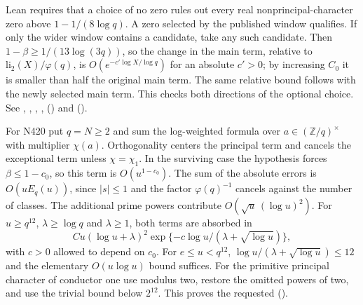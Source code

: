 Lean requires that a choice of no zero rules out every real
nonprincipal-character zero above $1-1/(8\log q)$. A zero selected
by the published window qualifies. If only the wider window contains a
candidate, take any such candidate. Then
$1-\beta\ge1/(13\log(3q))$, so the change in the main term, relative to
$\mathrm{li}_2(X)/\varphi(q)$, is
$O(e^{-c'\log X/\log q})$ for an absolute $c'>0$; by increasing $C_0$
it is smaller than half the original main term. The same relative
bound follows with the newly selected main term. This checks both
directions of the optional choice.
See , , , ,
 () and
 ().

For N420 put $q=N\ge2$ and sum the log-weighted formula over
$a\in(\mathbb Z/q)^\times$ with multiplier $\chi(a)$. Orthogonality
centers the principal term and cancels the exceptional term unless
$\chi=\chi_1$. In the surviving case the hypothesis 
forces $\beta\le 1-c_0$, so this term is $O(u^{1-c_0})$.
The sum of the absolute errors is $O(u E_q(u))$, since
$|s|\le1$ and the factor $\varphi(q)^{-1}$ cancels against the number
of classes. The additional prime powers contribute
$O(\sqrt u\,(\log u)^2)$. For $u\ge q^{12}$, $\lambda\ge\log q$
and $\lambda\ge1$, both terms are absorbed in
\[
 C u(\log u+\lambda)^2
   \exp\{-c\log u/(\lambda+\sqrt{\log u})\},
\]
with $c>0$ allowed to depend on $c_0$. For $e\le u<q^{12}$,
$\log u/(\lambda+\sqrt{\log u})\le12$ and the elementary
$O(u\log u)$ bound suffices. For the primitive principal character of
conductor one use modulus two, restore the omitted powers of two, and
use the trivial bound below $2^{12}$. This proves the requested
 ().

